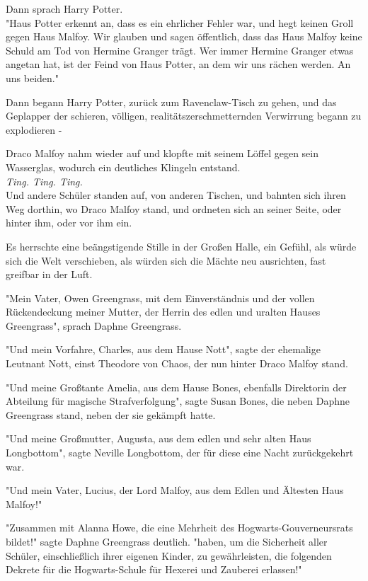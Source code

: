 {Dann sprach Harry Potter.\\ "Haus Potter erkennt an, dass es ein ehrlicher Fehler war, und hegt keinen Groll gegen Haus Malfoy. Wir glauben und sagen öffentlich, dass das Haus Malfoy keine Schuld am Tod von Hermine Granger trägt. Wer immer Hermine Granger etwas angetan hat, ist der Feind von Haus Potter, an dem wir uns rächen werden. An uns beiden."

Dann begann Harry Potter, zurück zum Ravenclaw-Tisch zu gehen, und das Geplapper der schieren, völligen, realitätszerschmetternden Verwirrung begann zu explodieren -

Draco Malfoy nahm wieder auf und klopfte mit seinem Löffel gegen sein Wasserglas, wodurch ein deutliches Klingeln entstand.\\ \emph{Ting. Ting. Ting.}\\ Und andere Schüler standen auf, von anderen Tischen, und bahnten sich ihren Weg dorthin, wo Draco Malfoy stand, und ordneten sich an seiner Seite, oder hinter ihm, oder vor ihm ein.

Es herrschte eine beängstigende Stille in der Großen Halle, ein Gefühl, als würde sich die Welt verschieben, als würden sich die Mächte neu ausrichten, fast greifbar in der Luft.

"Mein Vater, Owen Greengrass, mit dem Einverständnis und der vollen Rückendeckung meiner Mutter, der Herrin des edlen und uralten Hauses Greengrass", sprach Daphne Greengrass.

"Und mein Vorfahre, Charles, aus dem Hause Nott", sagte der ehemalige Leutnant Nott, einst Theodore von Chaos, der nun hinter Draco Malfoy stand.

"Und meine Großtante Amelia, aus dem Hause Bones, ebenfalls Direktorin der Abteilung für magische Strafverfolgung", sagte Susan Bones, die neben Daphne Greengrass stand, neben der sie gekämpft hatte.

"Und meine Großmutter, Augusta, aus dem edlen und sehr alten Haus Longbottom", sagte Neville Longbottom, der für diese eine Nacht zurückgekehrt war.

"Und mein Vater, Lucius, der Lord Malfoy, aus dem Edlen und Ältesten Haus Malfoy!"

"Zusammen mit Alanna Howe, die eine Mehrheit des Hogwarts-Gouverneursrats bildet!" sagte Daphne Greengrass deutlich. "haben, um die Sicherheit aller Schüler, einschließlich ihrer eigenen Kinder, zu gewährleisten, die folgenden Dekrete für die Hogwarts-Schule für Hexerei und Zauberei erlassen!"

}

